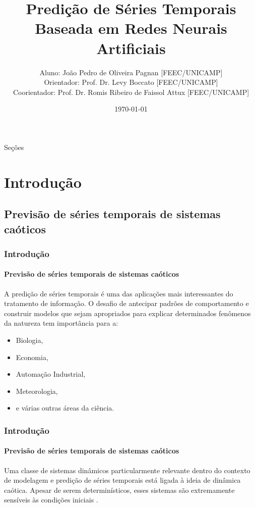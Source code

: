 \documentclass{beamer}
\title[Predição de Séries Temporais com Redes Neurais]{
 Predição de Séries Temporais Baseada em Redes Neurais
Artificiais}
\author[João Pedro de Oliveira Pagnan]{ \footnotesize
  Aluno: João Pedro de Oliveira Pagnan [FEEC/UNICAMP]\\
  Orientador: Prof. Dr. Levy Boccato [FEEC/UNICAMP]\\
  Coorientador: Prof. Dr. Romis Ribeiro de Faissol Attux [FEEC/UNICAMP]\\\medskip
  }
\institute[Universidade Estadual de Campinas ]{
  Departamento de Engenharia de Computação e Automação Industrial -- DCA \\
  }
\date{\scriptsize \today}
\begin{document}
\begin{frame}
  \titlepage
\end{frame}

\begin{frame}{Seções}
\begin{multicols}{2}
    \footnotesize \tableofcontents
\end{multicols}
\end{frame}

\section{Introdução}
\subsection{Previsão de séries temporais de sistemas caóticos}
\begin{frame}
    \frametitle{Introdução}
    \framesubtitle{Previsão de séries temporais de sistemas caóticos}
    \justifying A predição de séries temporais é uma das aplicações mais interessantes do tratamento de informação. O desafio de antecipar padrões de comportamento e construir modelos que sejam apropriados para explicar determinados fenômenos da natureza tem importância para a:
    
    \begin{itemize}[<+-| alert@+>]
        \item Biologia,
        \item Economia,
        \item Automação Industrial,
        \item Meteorologia,
        \item e várias outras áreas da ciência.
    \end{itemize}
\end{frame}

\begin{frame}
    \frametitle{Introdução}
    \framesubtitle{Previsão de séries temporais de sistemas caóticos}
    \justifying Uma classe de sistemas dinâmicos particularmente relevante dentro do contexto de modelagem e predição de séries temporais está ligada à ideia de dinâmica caótica. Apesar de serem determinísticos, esses sistemas são extremamente sensíveis às condições iniciais \cite{fiedler1994caos}.

\end{frame}
\end{document}
